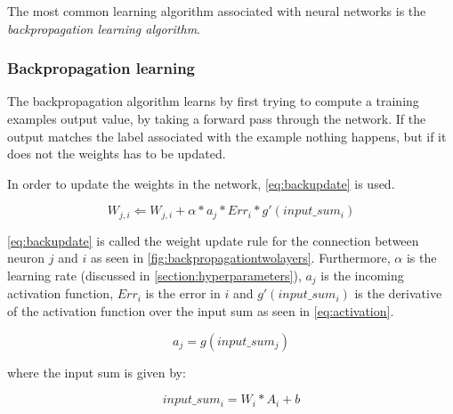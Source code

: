 The most common learning algorithm associated with neural networks is the \textit{backpropagation learning algorithm}.

\subsubsection{Backpropagation learning}
The backpropagation algorithm learns by first trying to compute a training examples output value, by taking a forward pass through the network. If the output matches the label associated with the example nothing happens, but if it does not the weights has to be updated.

In order to update the weights in the network, \autoref{eq:backupdate} is used.

\begin{equation}\label{eq:backupdate}
	W_{j,i} \Leftarrow W_{j,i}+ \alpha*a_{j}*Err_{i}*g'(input\_sum_{i})
\end{equation}

\autoref{eq:backupdate} is called the weight update rule for the connection between neuron $j$ and $i$ as seen in \autoref{fig:backpropagationtwolayers}. Furthermore, $\alpha$ is the learning rate (discussed in \autoref{section:hyperparameters}), $a_{j}$ is the incoming activation function, $Err_{i}$ is the error in $i$ and $g'(input\_sum_{i})$ is the derivative of the activation function over the input sum as seen in \autoref{eq:activation}.

\begin{equation}\label{eq:activation}
a_{j} = g(input\_sum_{j})
\end{equation}

where the input sum is given by:

\begin{equation}\label{eq:inputsum}
	input\_sum_{i} = W_{i}*A_{i}+b
\end{equation}


